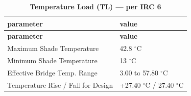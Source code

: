 \documentclass[12pt,a4paper]{report}
\numberwithin{table}{chapter}
\numberwithin{figure}{chapter}
\begin{document}
\vspace{1em}
\begin{longtable}{|L{5.5cm}|p{10.0cm}|}
\caption{\textbf{Temperature Load (TL) --- per IRC 6}}
\hline
\textbf{parameter} & \textbf{value} \\
\hline
\endfirsthead

\hline
\textbf{parameter} & \textbf{value} \\
\hline
\endhead
\textnormal{Maximum Shade Temperature} & 42.8 $^\circ$C \\[6pt]
\hline
\textnormal{Minimum Shade Temperature} & 13 $^\circ$C \\[6pt]
\hline
\textnormal{Effective Bridge Temp. Range} & 3.00 to 57.80 $^\circ$C \\[6pt]
\hline
\textnormal{Temperature Rise / Fall for Design} & +27.40 $^\circ$C / \textminus{}27.40 $^\circ$C \\[6pt]
\hline
\end{longtable}
\end{document}
